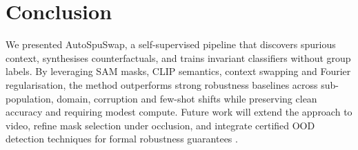 \documentclass{article}
\begin{document}
\section{Conclusion}
We presented AutoSpuSwap, a self-supervised pipeline that discovers spurious context, synthesises counterfactuals, and trains invariant classifiers without group labels. By leveraging SAM masks, CLIP semantics, context swapping and Fourier regularisation, the method outperforms strong robustness baselines across sub-population, domain, corruption and few-shot shifts while preserving clean accuracy and requiring modest compute. Future work will extend the approach to video, refine mask selection under occlusion, and integrate certified OOD detection techniques for formal robustness guarantees \cite{bitterwolf-2020-certifiably,meinke-2019-towards}.




\end{document}
